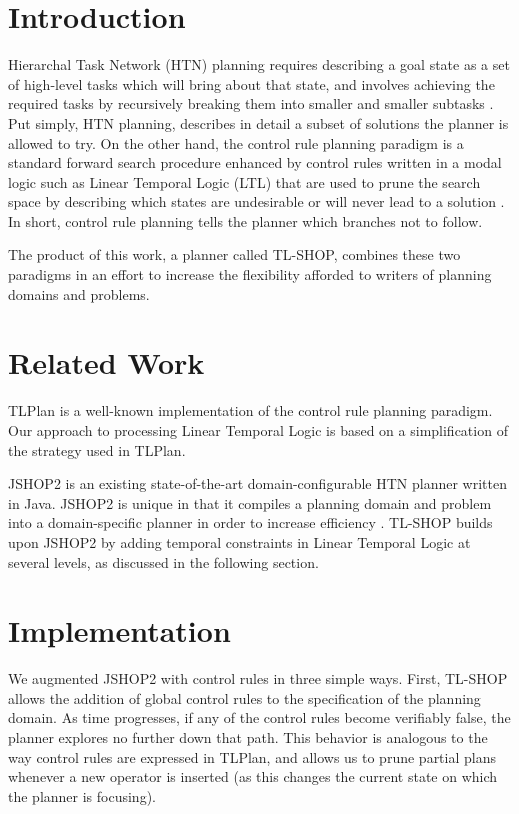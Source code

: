 \documentclass[12pt]{article}
\begin{document}


\section{Introduction}
Hierarchal Task Network (HTN) planning requires describing a goal state as a 
set of high-level tasks which will bring about that state, and involves 
achieving the required tasks by recursively breaking them into smaller and 
smaller subtasks \cite{nau2004apt}. Put simply, HTN planning, describes in 
detail a subset of  solutions the planner is allowed to try. On the other hand, 
the control rule planning paradigm is a standard forward search procedure 
enhanced by control rules written in a modal logic such as Linear Temporal 
Logic (LTL) that are used to prune the search space by describing which states 
are undesirable or will never lead to a solution \cite{nau2004apt}. In short, 
control rule planning tells the planner which branches not to follow.

The product of this work, a planner called TL-SHOP, combines these two 
paradigms in an effort to increase the flexibility afforded to writers of 
planning domains and problems.

\section{Related Work}
TLPlan\cite{bacchus1996utl} is a well-known implementation of the control rule 
planning paradigm. Our approach to processing Linear Temporal Logic is based on 
a simplification of the strategy used in TLPlan\cite{nau2004apt}.

JSHOP2\cite{ilghami:dj} is an existing state-of-the-art domain-configurable HTN 
planner written in Java. JSHOP2 is unique in that it compiles a planning domain 
and problem into a domain-specific planner in order to increase efficiency 
\cite{ilghami2003gas}. TL-SHOP builds upon JSHOP2 by adding temporal 
constraints in Linear Temporal Logic at several levels, as discussed in the 
following section.

\section{Implementation}
We augmented JSHOP2 with control rules in three simple ways. First, TL-SHOP 
allows the addition of global control rules to the specification of the 
planning domain. As time progresses, if any of the control rules become 
verifiably false, the planner explores no further down that path. This behavior 
is analogous to the way control rules are expressed in TLPlan, and allows us to 
prune partial plans whenever a new operator is inserted (as this changes the 
current state on which the planner is focusing).
\end{document}
